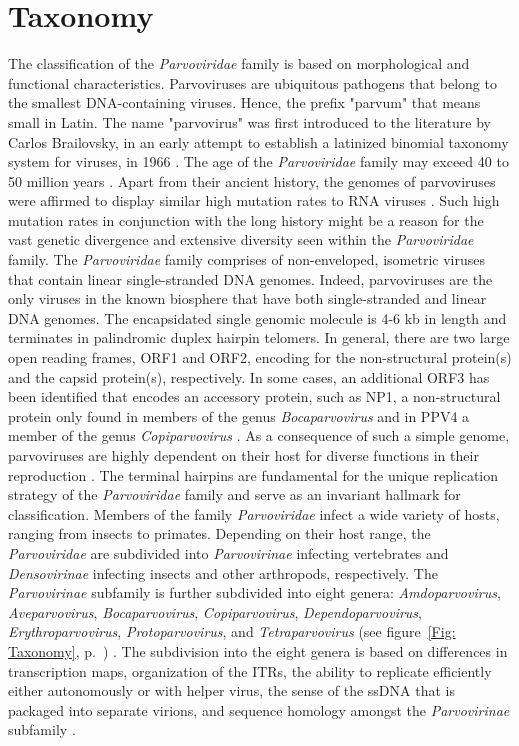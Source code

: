 \section{Taxonomy}
\label{sec:Taxonomy}
The classification of the \textit{Parvoviridae} family is based on morphological and functional characteristics. Parvoviruses are ubiquitous pathogens that belong to the smallest DNA-containing viruses. Hence, the prefix "parvum" that means small in Latin. The name "parvovirus" was first introduced to the literature by Carlos Brailovsky, in an early attempt to establish a latinized binomial taxonomy system for viruses, in 1966 \cite{pmid5902774}. The age of the \textit{Parvoviridae} family may exceed 40 to 50 million years \cite{pmid20861255}. Apart from their ancient history, the genomes of parvoviruses were affirmed to display similar high mutation rates to RNA viruses \cite{pmid1649336, pmid12716974, pmid10411508, pmid16537636, pmid15626758, pmid21795474}. Such high mutation rates in conjunction with the long history might be a reason for the vast genetic divergence and extensive diversity seen within the \textit{Parvoviridae} family.      
The \textit{Parvoviridae} family comprises of non-enveloped, isometric viruses that contain linear single-stranded DNA genomes. Indeed, parvoviruses are the only viruses in the known biosphere that have both single-stranded and linear DNA genomes. The encapsidated single genomic molecule is 4-6 kb in length and terminates in palindromic duplex hairpin telomers. In general, there are two large open reading frames, ORF1 and ORF2, encoding for the non-structural protein(s) and the capsid protein(s), respectively. In some cases, an additional ORF3 has been identified that encodes an accessory protein, such as NP1, a non-structural protein only found in members of the genus \textit{Bocaparvovirus} and in PPV4 a member of the genus \textit{Copiparvovirus} \cite{pmid6319731, pmid21049037, pmid20339886}. As a consequence of such a simple genome, parvoviruses are highly dependent on their host for diverse functions in their reproduction \cite{pmid3296697, pmid10497831}. The terminal hairpins are fundamental for the unique replication strategy of the \textit{Parvoviridae} family and serve as an invariant hallmark for classification.
Members of the family \textit{Parvoviridae} infect a wide variety of hosts, ranging from insects to primates.
Depending on their host range, the \textit{Parvoviridae} are subdivided into \textit{Parvovirinae} infecting vertebrates and \textit{Densovirinae} infecting insects and other arthropods, respectively. The \textit{Parvovirinae} subfamily is further subdivided into eight genera: \textit{Amdoparvovirus}, \textit{Aveparvovirus}, \textit{Bocaparvovirus}, \textit{Copiparvovirus}, \textit{Dependoparvovirus}, \textit{Erythroparvovirus}, \textit{Protoparvovirus}, and \textit{Tetraparvovirus} (see figure~\ref{Fig: Taxonomy}, p.~\pageref{Fig: Taxonomy}) \cite{pmid24212889}. The subdivision into the eight genera is based on differences in transcription maps, organization of the ITRs, the ability to replicate efficiently either autonomously or with helper virus, the sense of the ssDNA that is packaged into separate virions, and sequence homology amongst the \textit{Parvovirinae} subfamily \cite{pmid11222696, icvt}.

